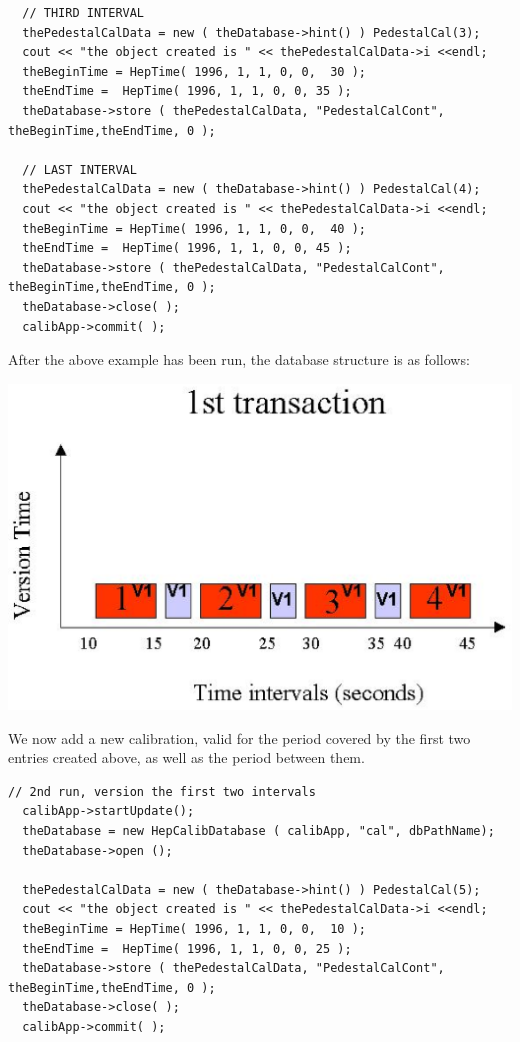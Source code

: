 \begin{verbatim}
  // THIRD INTERVAL 
  thePedestalCalData = new ( theDatabase->hint() ) PedestalCal(3); 
  cout << "the object created is " << thePedestalCalData->i <<endl; 
  theBeginTime = HepTime( 1996, 1, 1, 0, 0,  30 ); 
  theEndTime =  HepTime( 1996, 1, 1, 0, 0, 35 ); 
  theDatabase->store ( thePedestalCalData, "PedestalCalCont", theBeginTime,theEndTime, 0 ); 
  
  // LAST INTERVAL 
  thePedestalCalData = new ( theDatabase->hint() ) PedestalCal(4); 
  cout << "the object created is " << thePedestalCalData->i <<endl; 
  theBeginTime = HepTime( 1996, 1, 1, 0, 0,  40 ); 
  theEndTime =  HepTime( 1996, 1, 1, 0, 0, 45 ); 
  theDatabase->store ( thePedestalCalData, "PedestalCalCont", theBeginTime,theEndTime, 0 ); 
  theDatabase->close( ); 
  calibApp->commit( ); 

\end{verbatim}

\par

After the above example has been run, the database structure is as
follows:
\par

\includegraphics[width=.7\linewidth, scale=.5]{trans1}

\par

We now add a new calibration, valid for the period covered
by the first two entries created above, as well as the period between them.

\begin{verbatim}
// 2nd run, version the first two intervals 
  calibApp->startUpdate(); 
  theDatabase = new HepCalibDatabase ( calibApp, "cal", dbPathName); 
  theDatabase->open (); 
  
  thePedestalCalData = new ( theDatabase->hint() ) PedestalCal(5); 
  cout << "the object created is " << thePedestalCalData->i <<endl; 
  theBeginTime = HepTime( 1996, 1, 1, 0, 0,  10 ); 
  theEndTime =  HepTime( 1996, 1, 1, 0, 0, 25 ); 
  theDatabase->store ( thePedestalCalData, "PedestalCalCont", theBeginTime,theEndTime, 0 ); 
  theDatabase->close( ); 
  calibApp->commit( ); 
\end{verbatim}

